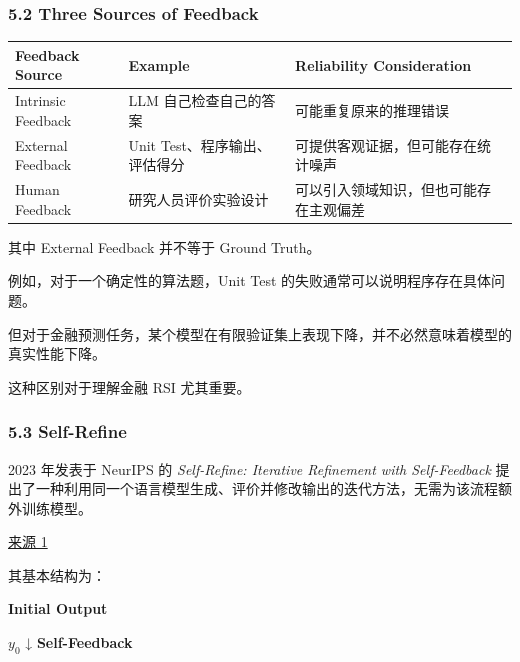 \hypertarget{part-3-34-0001-three-sources-of-feedback}{%
\subsubsection{5.2 Three Sources of Feedback}\label{part-3-34-0001-three-sources-of-feedback}}

\begin{readertable}
\begin{longtable}[]{@{}
  >{\raggedright\arraybackslash}p{}
  >{\raggedright\arraybackslash}p{}
  >{\raggedright\arraybackslash}p{}@{}}
\toprule
Feedback Source & Example & Reliability Consideration \\
\midrule
\endhead
Intrinsic Feedback & LLM 自己检查自己的答案 & 可能重复原来的推理错误 \\
External Feedback & Unit Test、程序输出、评估得分 & 可提供客观证据，但可能存在统计噪声 \\
Human Feedback & 研究人员评价实验设计 & 可以引入领域知识，但也可能存在主观偏差 \\
\bottomrule
\end{longtable}
\end{readertable}

其中 External Feedback 并不等于 Ground Truth。

例如，对于一个确定性的算法题，Unit Test 的失败通常可以说明程序存在具体问题。

但对于金融预测任务，某个模型在有限验证集上表现下降，并不必然意味着模型的真实性能下降。

这种区别对于理解金融 RSI 尤其重要。

\hypertarget{part-3-34-0001-self-refine}{%
\subsubsection{5.3 Self-Refine}\label{part-3-34-0001-self-refine}}

2023 年发表于 NeurIPS 的 \emph{Self-Refine: Iterative Refinement with Self-Feedback} 提出了一种利用同一个语言模型生成、评价并修改输出的迭代方法，无需为该流程额外训练模型。

\href{https://proceedings.neurips.cc/paper_files/paper/2023/hash/91edff07232fb1b55a505a9e9f6c0ff3-Abstract-Conference.html}{来源 1}

其基本结构为：

\textbf{Initial Output}

\(y_0\) ↓ \textbf{Self-Feedback}


